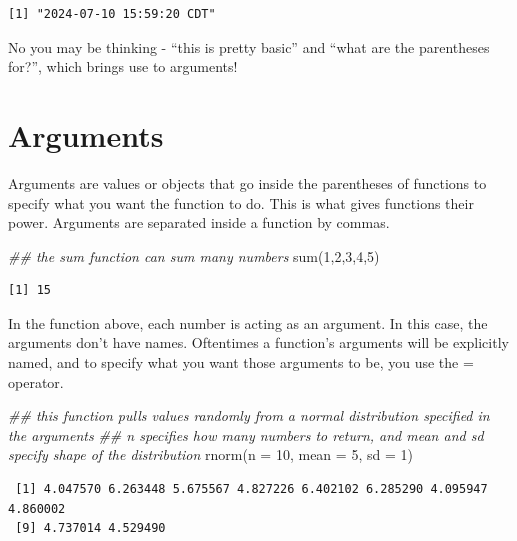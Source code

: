 \documentclass[
  letterpaper,
  DIV=11,
  numbers=noendperiod]{scrreprt}
\newenvironment{Shaded}{\begin{snugshade}}{\end{snugshade}}
\newcommand{\AttributeTok}[1]{\textcolor[rgb]{0.40,0.45,0.13}{#1}}
\newcommand{\DecValTok}[1]{\textcolor[rgb]{0.68,0.00,0.00}{#1}}
\newcommand{\DocumentationTok}[1]{\textcolor[rgb]{0.37,0.37,0.37}{\textit{#1}}}
\newcommand{\FunctionTok}[1]{\textcolor[rgb]{0.28,0.35,0.67}{#1}}
\newcommand{\NormalTok}[1]{\textcolor[rgb]{0.00,0.23,0.31}{#1}}
\begin{document}
\begin{verbatim}
[1] "2024-07-10 15:59:20 CDT"
\end{verbatim}

No you may be thinking - ``this is pretty basic'' and ``what are the
parentheses for?'', which brings use to arguments!

\section{Arguments}\label{arguments}

Arguments are values or objects that go inside the parentheses of
functions to specify what you want the function to do. This is what
gives functions their power. Arguments are separated inside a function
by commas.

\begin{Shaded}
\begin{Highlighting}[]
\DocumentationTok{\#\# the sum function can sum many numbers}
\FunctionTok{sum}\NormalTok{(}\DecValTok{1}\NormalTok{,}\DecValTok{2}\NormalTok{,}\DecValTok{3}\NormalTok{,}\DecValTok{4}\NormalTok{,}\DecValTok{5}\NormalTok{)}
\end{Highlighting}
\end{Shaded}

\begin{verbatim}
[1] 15
\end{verbatim}

In the function above, each number is acting as an argument. In this
case, the arguments don't have names. Oftentimes a function's arguments
will be explicitly named, and to specify what you want those arguments
to be, you use the = operator.

\begin{Shaded}
\begin{Highlighting}[]
\DocumentationTok{\#\# this function pulls values randomly from a normal distribution specified in the arguments}
\DocumentationTok{\#\# n specifies how many numbers to return, and mean and sd specify shape of the distribution}
\FunctionTok{rnorm}\NormalTok{(}\AttributeTok{n =} \DecValTok{10}\NormalTok{, }\AttributeTok{mean =} \DecValTok{5}\NormalTok{, }\AttributeTok{sd =} \DecValTok{1}\NormalTok{)}
\end{Highlighting}
\end{Shaded}

\begin{verbatim}
 [1] 4.047570 6.263448 5.675567 4.827226 6.402102 6.285290 4.095947 4.860002
 [9] 4.737014 4.529490
\end{verbatim}
\end{document}
